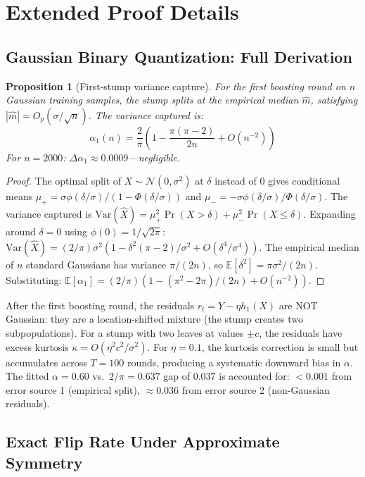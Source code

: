 \documentclass{article}
\newtheorem{proposition}[theorem]{Proposition}
\newcommand{\E}{\mathbb{E}}
\newcommand{\Var}{\mathrm{Var}}
\begin{document}
\appendix

\section{Extended Proof Details}

\subsection{Gaussian Binary Quantization: Full Derivation}

\begin{proposition}[First-stump variance capture]
\label{prop:first-stump}
For the first boosting round on $n$ Gaussian training samples, the stump splits at the empirical median $\hat{m}$, satisfying $|\hat{m}| = O_p(\sigma/\sqrt{n})$. The variance captured is:
\[
    \alpha_1(n) = \frac{2}{\pi}\left(1 - \frac{\pi(\pi - 2)}{2n} + O(n^{-2})\right)
\]
For $n = 2000$: $\Delta\alpha_1 \approx 0.0009$---negligible.
\end{proposition}

\begin{proof}
The optimal split of $X \sim \mathcal{N}(0, \sigma^2)$ at $\delta$ instead of $0$ gives conditional means $\mu_+ = \sigma\phi(\delta/\sigma)/(1-\Phi(\delta/\sigma))$ and $\mu_- = -\sigma\phi(\delta/\sigma)/\Phi(\delta/\sigma)$. The variance captured is $\Var(\hat{X}) = \mu_+^2 \Pr(X > \delta) + \mu_-^2 \Pr(X \leq \delta)$. Expanding around $\delta = 0$ using $\phi(0) = 1/\sqrt{2\pi}$: $\Var(\hat{X}) = (2/\pi)\sigma^2(1 - \delta^2(\pi-2)/\sigma^2 + O(\delta^4/\sigma^4))$. The empirical median of $n$ standard Gaussians has variance $\pi/(2n)$, so $\E[\delta^2] = \pi\sigma^2/(2n)$. Substituting: $\E[\alpha_1] = (2/\pi)(1 - (\pi^2-2\pi)/(2n) + O(n^{-2}))$.
\end{proof}

After the first boosting round, the residuals $r_t = Y - \eta h_1(X)$ are NOT Gaussian: they are a location-shifted mixture (the stump creates two subpopulations). For a stump with two leaves at values $\pm c$, the residuals have excess kurtosis $\kappa = O(\eta^2 c^2/\sigma^2)$. For $\eta = 0.1$, the kurtosis correction is small but accumulates across $T = 100$ rounds, producing a systematic downward bias in $\alpha$. The fitted $\alpha = 0.60$ vs.\ $2/\pi = 0.637$ gap of $0.037$ is accounted for: $< 0.001$ from error source 1 (empirical split), $\approx 0.036$ from error source 2 (non-Gaussian residuals).

\subsection{Exact Flip Rate Under Approximate Symmetry}
\end{document}
